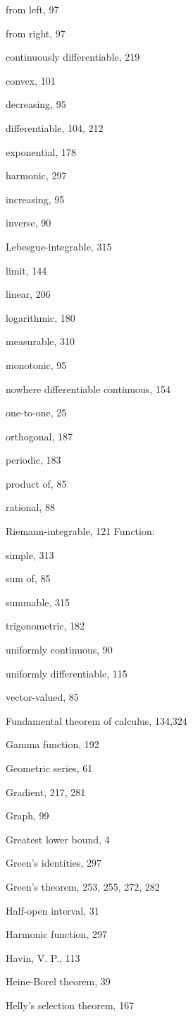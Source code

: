 \documentclass[10pt]{article}
\begin{document}
from left, 97

from right, 97

continuously differentiable, 219

convex, 101

decreasing, 95

differentiable, 104, 212

exponential, 178

harmonic, 297

increasing, 95

inverse, 90

Lebesgue-integrable, 315

limit, 144

linear, 206

logarithmic, 180

measurable, 310

monotonic, 95

nowhere differentiable continuous, 154

one-to-one, 25

orthogonal, 187

periodic, 183

product of, 85

rational, 88

Riemann-integrable, 121
Function:

simple, 313

sum of, 85

summable, 315

trigonometric, 182

uniformly continuous, 90

uniformly differentiable, 115

vector-valued, 85

Fundamental theorem of calculus, 134,324

Gamma function, 192

Geometric series, 61

Gradient, 217, 281

Graph, 99

Greatest lower bound, 4

Green's identities, 297

Green's theorem, 253, 255, 272, 282

Half-open interval, 31

Harmonic function, 297

Havin, V. P., 113

Heine-Borel theorem, 39

Helly's selection theorem, 167
\end{document}
